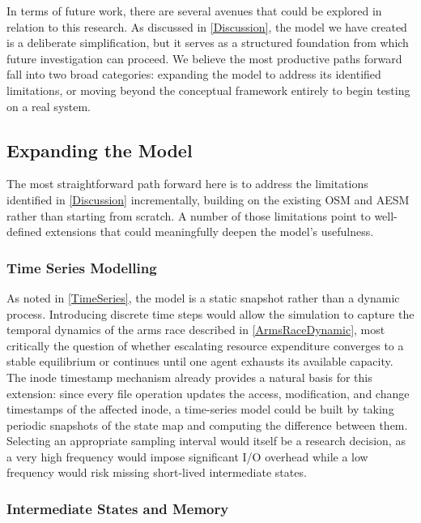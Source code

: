 In terms of future work, there are several avenues that could be explored in relation to this research. As discussed in \autoref{Discussion}, the model we have created is a deliberate simplification, but it serves as a structured foundation from which future investigation can proceed. We believe the most productive paths forward fall into two broad categories: expanding the model to address its identified limitations, or moving beyond the conceptual framework entirely to begin testing on a real system.

\subsection{Expanding the Model}
\label{ExpandingTheModel}

The most straightforward path forward here is to address the limitations identified in \autoref{Discussion} incrementally, building on the existing OSM and AESM rather than starting from scratch. A number of those limitations point to well-defined extensions that could meaningfully deepen the model's usefulness.

\subsubsection{Time Series Modelling}
\label{TimeSeriesModelling}

As noted in \autoref{TimeSeries}, the model is a static snapshot rather than a dynamic process. Introducing discrete time steps would allow the simulation to capture the temporal dynamics of the arms race described in \autoref{ArmsRaceDynamic}, most critically the question of whether escalating resource expenditure converges to a stable equilibrium or continues until one agent exhausts its available capacity. The inode timestamp mechanism already provides a natural basis for this extension: since every file operation updates the access, modification, and change timestamps of the affected inode, a time-series model could be built by taking periodic snapshots of the state map and computing the difference between them. Selecting an appropriate sampling interval would itself be a research decision, as a very high frequency would impose significant I/O overhead while a low frequency would risk missing short-lived intermediate states.

\subsubsection{Intermediate States and Memory}
\label{IntermediateStatesMemory}

